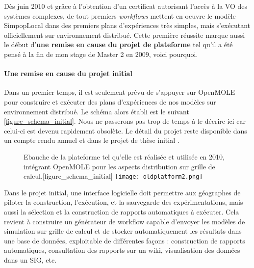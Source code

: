 
Dès juin 2010 et grâce à l'obtention d'un certificat autorisant l'accès à la VO des systèmes complexes, de tout premiers \textit{workflows} mettent en oeuvre le modèle SimpopLocal dans des premiers plans d'expériences très simples, mais s'exécutant officiellement sur environnement distribué. Cette première réussite marque aussi le début d'\textbf{une remise en cause du projet de plateforme} tel qu'il a été pensé à la fin de mon stage de Master 2 en 2009, voici pourquoi.

\paragraph {Une remise en cause du projet initial}

Dans un premier temps, il est seulement prévu de s'appuyer sur OpenMOLE pour construire et exécuter des plans d'expériences de nos modèles sur environnement distribué. Le schéma alors établi est le suivant \ref{figure_schema_initial}. Nous ne passerons pas trop de temps à le décrire ici car celui-ci est devenu rapidement obsolète. Le détail du projet reste disponible dans un compte rendu annuel et dans le projet de thèse initial \autocites{Rey2010, Rey2009}.

\begin{figure}[!htbp]
	\begin{sidecaption}{Ebauche de la plateforme tel qu'elle est réalisée et utilisée en 2010, intégrant OpenMOLE pour les aspects distribution sur grille de calcul.}[figure_schema_initial]
	 \centering
	 	\texttt{[image: oldplatform2.png]}
 \end{sidecaption}
\end{figure}

Dans le projet initial, une interface logicielle doit permettre aux géographes de piloter la construction, l'exécution, et la sauvegarde des expérimentations, mais aussi la sélection et la construction de rapports automatiques à exécuter. Cela revient à construire un générateur de workflow capable d'envoyer les modèles de simulation sur grille de calcul et de stocker automatiquement les résultats dans une base de données, exploitable de différentes façons : construction de rapports automatiques, consultation des rapports sur un wiki, visualisation des données dans un SIG, etc.

